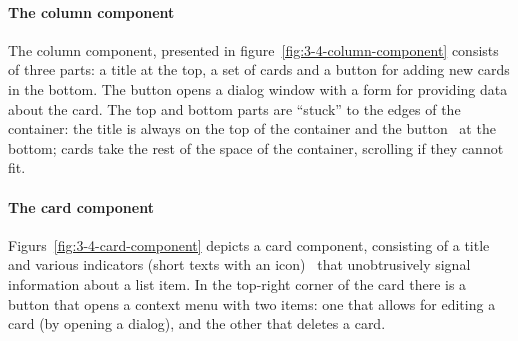 \paragraph{The column component}
The column component, presented in figure~\ref{fig:3-4-column-component} consists of three parts: a title at the top, a set of cards and a button for adding new cards in the bottom.
The button opens a dialog window with a form for providing data about the card.
The top and bottom parts are \enquote{stuck} to the edges of the container: the title is always on the top of the container and the button \textendash\ at the bottom;
cards take the rest of the space of the container, scrolling if they cannot fit.

\paragraph{The card component}
Figurs~\ref{fig:3-4-card-component} depicts a card component, consisting of a title and various indicators (short texts with an icon) \textendash\ that unobtrusively signal information about a list item.
In the top-right corner of the card there is a button that opens a context menu with two items: one that allows for editing a card (by opening a dialog), and the other that deletes a card.

